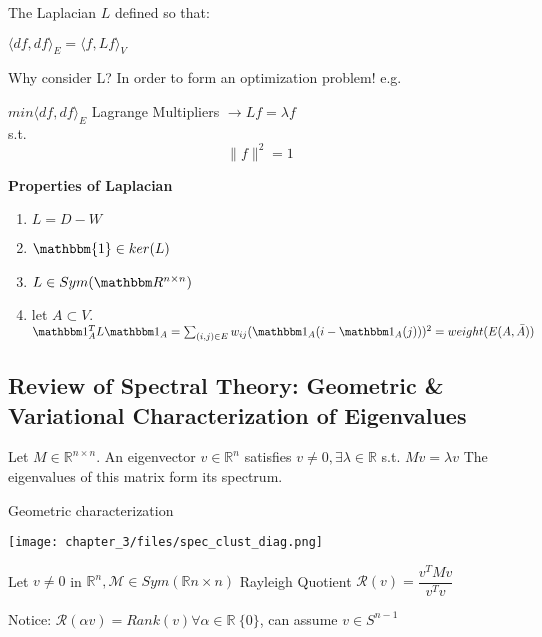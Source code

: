 {	The Laplacian $L$ defined so that:
	\begin{center}
		$\langle df, df\rangle_E = \langle f,Lf\rangle_V$
	\end{center}
	
	Why consider L? In order to form an optimization problem!
	e.g. 
	\begin{center}
		$min \langle df, df\rangle_E $ \indent Lagrange Multipliers $\rightarrow Lf = \lambda f$\\
		s.t. \[ \lVert f \rVert ^2 = 1 \]
	\end{center}
	
	\textbf{Properties of Laplacian}
	\begin{enumerate}
		\item $L = D - W$
		\item $\mathbbm{1} \in ker(L)$
		\item $L \in Sym(\mathbbm R^{n\times n})$
		\item let $A \subset V$. $\mathbbm 1_A^T L \mathbbm 1_A = \sum_{(i,j) \in E} w_{ij} (\mathbbm  1_A(i - \mathbbm 1_A(j)) )^2 = weight(E(A, \bar{A})) $
	\end{enumerate}
	
	\subsection{Review of Spectral Theory: Geometric \& Variational Characterization of Eigenvalues}
	
	\begin{definition}
		Let $M \in \mathbb R^{n \times n}$. An eigenvector $v \in \mathbb R^n$ satisfies $v \neq 0, \exists\lambda \in \mathbb R $ s.t. $Mv = \lambda v$
		The eigenvalues of this matrix form its spectrum.
	\end{definition}
	
	\begin{theorem}
		
		Geometric characterization
		
		\texttt{[image: chapter\_3/files/spec\_clust\_diag.png]}
	\end{theorem}
	
	\begin{definition}
		Let $v \neq 0 $ in $\mathbb R^n, \mathcal M \in Sym(\mathbb R{n \times n})$
		Rayleigh Quotient
		$\mathcal R(v) = \dfrac{v^T M v}{v^Tv}$
		
		Notice: $\mathcal R(\alpha v) = Rank(v) \forall \alpha \in \mathbb R \ \{0\}$, can assume $v \in S^{n-1}$
	\end{definition}
	
}
